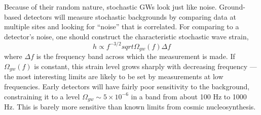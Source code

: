 \documentclass[binding=0.6cm, LaM]{sapthesis}
\begin{document}
Because of their random nature, stochastic GWs look just like noise. 
Ground- based detectors will measure stochastic backgrounds by comparing data at multiple sites and looking for “noise” that is correlated. 
For comparing to a detector’s noise, one should construct the characteristic stochastic wave strain,
\begin{equation}
h \propto f^{-3/2}sqrt{\Omega_{gw}(f)\Delta f}
\end{equation}
where $\Delta f$ is the frequency band across which the measurement is made. 
If $\Omega_{gw}(f)$ is constant, this strain level grows sharply with decreasing frequency — the most interesting limits are likely to be set by measurements at low frequencies.
Early detectors will have fairly poor sensitivity to the background, constraining it to a level $\Omega_{gw} \sim 5 \times 10^{-6}$ in a band from about 100 Hz to 1000 Hz. 
This is barely more sensitive than known limits from cosmic nucleosynthesis.
\end{document}
